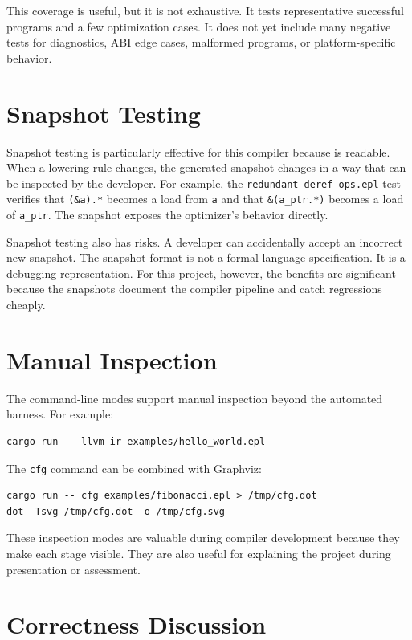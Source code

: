 This coverage is useful, but it is not exhaustive. It tests representative
successful programs and a few optimization cases. It does not yet include many
negative tests for diagnostics, ABI edge cases, malformed programs, or
platform-specific behavior.

\section{Snapshot Testing}

Snapshot testing is particularly effective for this compiler because \irtree{}
is readable. When a lowering rule changes, the generated snapshot changes in a
way that can be inspected by the developer. For example, the
\texttt{redundant\_deref\_ops.epl} test verifies that \texttt{(\&a).*} becomes
a load from \texttt{a} and that \texttt{\&(a\_ptr.*)} becomes a load of
\texttt{a\_ptr}. The snapshot exposes the optimizer's behavior directly.

Snapshot testing also has risks. A developer can accidentally accept an
incorrect new snapshot. The snapshot format is not a formal language
specification. It is a debugging representation. For this project, however, the
benefits are significant because the snapshots document the compiler pipeline
and catch regressions cheaply.

\section{Manual Inspection}

The command-line modes support manual inspection beyond the automated harness.
For example:

\begin{lstlisting}[caption={Inspecting generated LLVM IR}]
cargo run -- llvm-ir examples/hello_world.epl
\end{lstlisting}

The \texttt{cfg} command can be combined with Graphviz:

\begin{lstlisting}[caption={Generating a CFG graph}]
cargo run -- cfg examples/fibonacci.epl > /tmp/cfg.dot
dot -Tsvg /tmp/cfg.dot -o /tmp/cfg.svg
\end{lstlisting}

These inspection modes are valuable during compiler development because they
make each stage visible. They are also useful for explaining the project during
presentation or assessment.

\section{Correctness Discussion}

